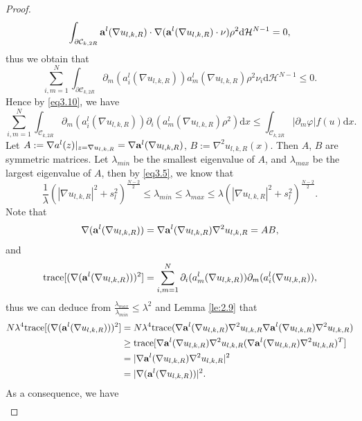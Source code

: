\documentclass[12pt]{amsart}
\theoremstyle{definition}
\theoremstyle{remark}
\theoremstyle{conclusion}
\theoremstyle{conjecture}
\numberwithin{equation}{section}
\begin{document}
\begin{proof}
$$\int_{\partial\mathcal{C}_{k,2R}}{\bf{a}}^l(\nabla u_{l,k,R})\cdot\nabla({\bf{a}}^l(\nabla u_{l,k,R})\cdot\nu)\rho^2\mathrm{d}\mathcal{H}^{N-1}=0,$$
thus we obtain that
\begin{equation*}
    \sum\limits_{i,m=1}^{N}\int_{\partial\mathcal{C}_{k,2R}}\partial_m (a^l_i(\nabla u_{l,k,R}))a^l_{m}(\nabla u_{l,k,R})\rho ^2\nu_i \mathrm{d}\mathcal{H}^{N-1}\leq0.
\end{equation*}
Hence by \eqref{eq3.10}, we have
\begin{equation*}
    \sum\limits_{i,m=1}^{N}\int_{\mathcal{C}_{k,2R}}\partial_m (a^l_i(\nabla u_{l,k,R}))\partial_i(a^l_m(\nabla u_{l,k,R})\rho ^2)\mathrm{d}x
    \leq \int_{\mathcal{C}_{k,2R}}|\partial_m \varphi| f(u)\mathrm{d}x.
\end{equation*}
Let $A:=\nabla a^l(z)|_{z=\nabla u_{l,k,R}}=\nabla {\bf{a}}^l(\nabla u_{l,k,R})$, $B:=\nabla^2 u_{l,k,R}(x)$. Then $A$, $B$ are symmetric matrices. Let $\lambda_{min}$ be the
smallest eigenvalue of $A$, and $\lambda_{max}$ be the largest eigenvalue of $A$, then by \eqref{eq3.5}, we know that
$$\frac{1}{\lambda}(|\nabla u_{l,k,R}|^2+s_l^2)^{\frac{N-2}{2}}\leq\lambda_{min}\leq\lambda_{max}\leq\lambda(|\nabla u_{l,k,R}|^2+s_l^2)^{\frac{N-2}{2}}.$$
Note that
$$\nabla ({\bf{a}}^l(\nabla u_{l,k,R}))=\nabla {\bf{a}}^l(\nabla u_{l,k,R})\nabla^2u_{l,k,R}=AB,$$
and
$$\mathrm{trace} [(\nabla ({\bf{a}}^l(\nabla u_{l,k,R})))^2]=\sum\limits_{i,m=1}^{N}\partial_i (a^l_m(\nabla u_{l,k,R}))\partial_m (a^l_i(\nabla u_{l,k,R})),$$
thus we can deduce from  $\frac{\lambda_{max}}{\lambda_{min}}\leq\lambda^{2}$ and Lemma \ref{le:2.9} that
\begin{equation*}
    \begin{aligned}
        N\lambda^4 \mathrm{trace} [(\nabla ({\bf{a}}^l(\nabla u_{l,k,R})))^2]
        &=  N\lambda^4\mathrm{trace}(\nabla {\bf{a}}^l(\nabla u_{l,k,R})\nabla^2u_{l,k,R}\nabla {\bf{a}}^l(\nabla u_{l,k,R})\nabla^2u_{l,k,R})\\
        &\geq  \mathrm{trace}[\nabla {\bf{a}}^l(\nabla u_{l,k,R})\nabla^2u_{l,k,R}(\nabla {\bf{a}}^l(\nabla u_{l,k,R})\nabla^2u_{l,k,R})^T]\\
        &=|\nabla {\bf{a}}^l(\nabla u_{l,k,R})\nabla^2u_{l,k,R}|^2\\
        &=|\nabla ({\bf{a}}^l(\nabla u_{l,k,R}))|^2.
    \end{aligned}
\end{equation*}
As a consequence, we have
\begin{equation*}
    \begin{aligned}

\end{aligned}
\end{equation*}
\end{proof}
\end{document}
